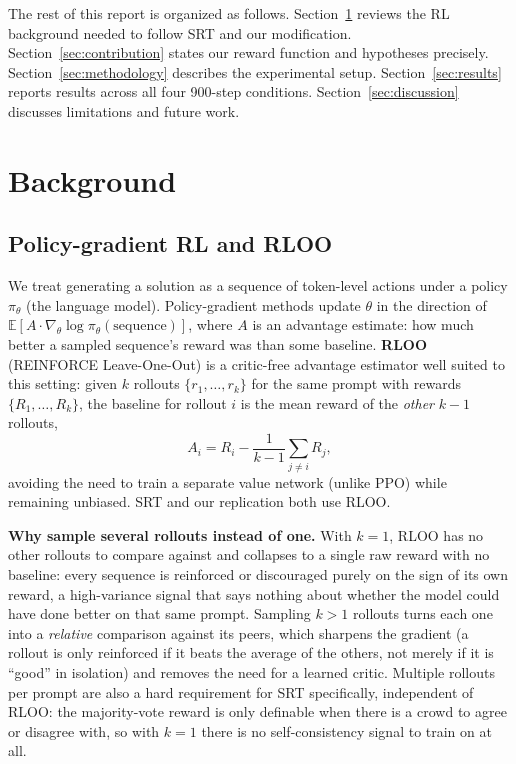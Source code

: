 \documentclass{article}
\begin{document}
The rest of this report is organized as follows. Section~\ref{sec:background}
reviews the RL background needed to follow SRT and our modification.
Section~\ref{sec:contribution} states our reward function and hypotheses
precisely. Section~\ref{sec:methodology} describes the experimental setup.
Section~\ref{sec:results} reports results across all four 900-step
conditions. Section~\ref{sec:discussion} discusses limitations and future
work.


\section{Background}
\label{sec:background}

\subsection{Policy-gradient RL and RLOO}

We treat generating a solution as a sequence of token-level actions under a
policy $\pi_\theta$ (the language model). Policy-gradient methods update
$\theta$ in the direction of $\mathbb{E}[A \cdot \nabla_\theta \log
\pi_\theta(\text{sequence})]$, where $A$ is an advantage estimate: how much
better a sampled sequence's reward was than some baseline. \textbf{RLOO}
(REINFORCE Leave-One-Out) \citep{kool2019buy,ahmadian2024back} is a
critic-free advantage estimator well suited to this setting: given $k$
rollouts $\{r_1,\dots,r_k\}$ for the same prompt with rewards
$\{R_1,\dots,R_k\}$, the baseline for rollout $i$ is the mean reward of the
\emph{other} $k-1$ rollouts,
\[
A_i = R_i - \frac{1}{k-1}\sum_{j\neq i} R_j ,
\]
avoiding the need to train a separate value network (unlike PPO) while
remaining unbiased. SRT and our replication both use RLOO.

\textbf{Why sample several rollouts instead of one.} With $k{=}1$, RLOO has
no other rollouts to compare against and collapses to a single raw reward
with no baseline: every sequence is reinforced or discouraged purely on the
sign of its own reward, a high-variance signal that says nothing about
whether the model could have done better on that same prompt. Sampling
$k>1$ rollouts turns each one into a \emph{relative} comparison against its
peers, which sharpens the gradient (a rollout is only reinforced if it beats
the average of the others, not merely if it is ``good'' in isolation) and
removes the need for a learned critic. Multiple rollouts per prompt are also
a hard requirement for SRT specifically, independent of RLOO: the
majority-vote reward is only definable when there is a crowd to agree or
disagree with, so with $k{=}1$ there is no self-consistency signal to train
on at all.
\end{document}
